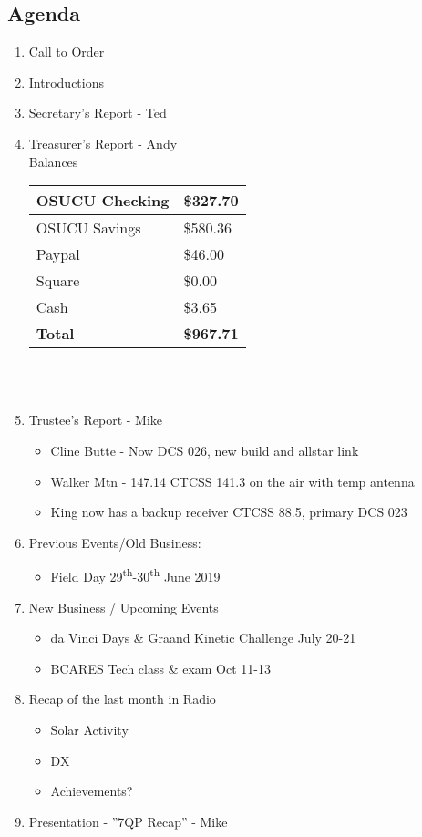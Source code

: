\documentclass[letter,11pt]{extarticle}
\begin{document}
	\subsection*{Agenda}
	\begin{enumerate}
		\item Call to Order
		\item Introductions
		\item Secretary's Report - Ted
		\item Treasurer's Report - Andy \\
				Balances 
			\begin{tabular}{|l|l|} \hline
				OSUCU Checking & \$327.70 \\ \hline
				OSUCU Savings & \$580.36 \\ \hline
				Paypal & \$46.00 \\ \hline
				Square & \$0.00 \\ \hline
				Cash & \$3.65 \\ \hline
				\textbf{Total} & \textbf{\$967.71} \\ \hline
			\end{tabular} \\ \\
		\item Trustee's Report - Mike
			\begin{itemize}
				\item Cline Butte - Now DCS 026, new build and allstar link
				\item Walker Mtn - 147.14 CTCSS 141.3 on the air with temp antenna
				\item King now has a backup receiver CTCSS 88.5, primary DCS 023
			\end{itemize}
		\item Previous Events/Old Business:
		\begin{itemize}
				\item Field Day 29\textsuperscript{th}-30\textsuperscript{th} June 2019
		\end{itemize}
			
		\item  New Business / Upcoming Events
			\begin{itemize}
				\item da Vinci Days \& Graand Kinetic Challenge July 20-21
				\item BCARES Tech class \& exam Oct 11-13
			\end{itemize}
		\item Recap of the last month in Radio
			\begin{itemize}
				\item Solar Activity
				\item DX
				\item Achievements?
			\end{itemize}
		\item  Presentation - ''7QP Recap'' - Mike

	\end{enumerate}
\end{document}
